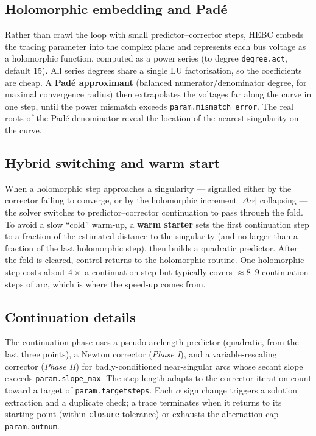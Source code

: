\documentclass[11pt,a4paper]{article}
\newcommand{\code}[1]{\texttt{#1}}
\begin{document}
\subsection{Holomorphic embedding and Pad\'e}
Rather than crawl the loop with small predictor--corrector steps, HEBC embeds the tracing
parameter into the complex plane and represents each bus voltage as a holomorphic
function, computed as a power series (to degree \code{degree.act}, default 15). All
series degrees share a single LU factorisation, so the coefficients are cheap. A
\textbf{Pad\'e approximant} (balanced numerator/denominator degree, for maximal
convergence radius) then extrapolates the voltages far along the curve in one step, until
the power mismatch exceeds \code{param.mismatch_error}. The real roots of the Pad\'e
denominator reveal the location of the nearest singularity on the curve.

\subsection{Hybrid switching and warm start}
When a holomorphic step approaches a singularity --- signalled either by the corrector
failing to converge, or by the holomorphic increment $|\Delta\alpha|$ collapsing --- the
solver switches to predictor--corrector continuation to pass through the fold. To avoid a
slow ``cold'' warm-up, a \textbf{warm starter} sets the first continuation step to a
fraction of the estimated distance to the singularity (and no larger than a fraction of
the last holomorphic step), then builds a quadratic predictor. After the fold is cleared,
control returns to the holomorphic routine. One holomorphic step costs about
$4\times$ a continuation step but typically covers $\approx 8$--$9$ continuation steps of
arc, which is where the speed-up comes from.

\subsection{Continuation details}
The continuation phase uses a pseudo-arclength predictor (quadratic, from the last three
points), a Newton corrector (\emph{Phase I}), and a variable-rescaling corrector
(\emph{Phase II}) for badly-conditioned near-singular arcs whose secant slope exceeds
\code{param.slope_max}. The step length adapts to the corrector iteration count toward a
target of \code{param.targetsteps}. Each $\alpha$ sign change triggers a solution
extraction and a duplicate check; a trace terminates when it returns to its starting
point (within \code{closure} tolerance) or exhausts the alternation cap
\code{param.outnum}.
\end{document}

